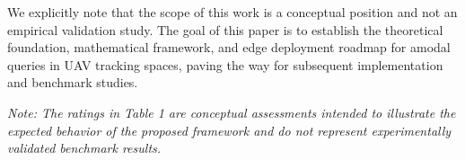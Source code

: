 \documentclass[10pt,conference,letterpaper,twocolumn]{article}
\begin{document}
We explicitly note that the scope of this work is a conceptual position and not an empirical validation study. The goal of this paper is to establish the theoretical foundation, mathematical framework, and edge deployment roadmap for amodal queries in UAV tracking spaces, paving the way for subsequent implementation and benchmark studies.

\begin{table}[t]
\centering
\caption{Comparison of traditional tracking models and the proposed Counterfactual Amodal Anchor model under various occlusion levels.}
\label{tab:comparison}
\begin{flushleft}
\small\textit{Note: The ratings in Table 1 are conceptual assessments intended to illustrate the expected behavior of the proposed framework and do not represent experimentally validated benchmark results.}
\end{flushleft}
\end{table}
\end{document}
